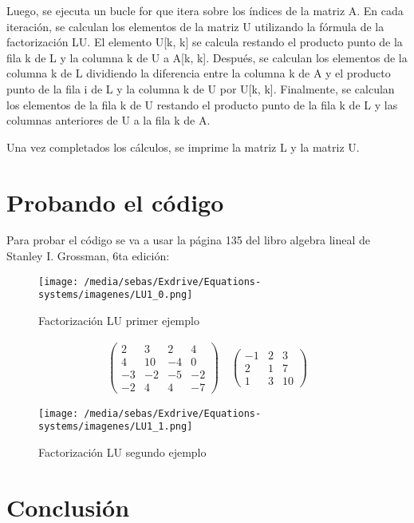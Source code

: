 \documentclass[letterpaper,12pt]{article}
\begin{document}
Luego, se ejecuta un bucle for que itera sobre los índices de la matriz A. En cada iteración, se calculan los elementos de la matriz U utilizando la fórmula de la factorización LU. El elemento U[k, k] se calcula restando el producto punto de la fila k de L y la columna k de U a A[k, k]. Después, se calculan los elementos de la columna k de L dividiendo la diferencia entre la columna k de A y el producto punto de la fila i de L y la columna k de U por U[k, k]. Finalmente, se calculan los elementos de la fila k de U restando el producto punto de la fila k de L y las columnas anteriores de U a la fila k de A.

Una vez completados los cálculos, se imprime la matriz L y la matriz U.

\section*{Probando el código}
Para probar el código se va a usar la página 135 del libro algebra lineal de Stanley I. Grossman, 6ta edición:
\begin{figure}[htbp]
    \centering
    \texttt{[image: /media/sebas/Exdrive/Equations-systems/imagenes/LU1\_0.png]}
    \caption{Factorización LU primer ejemplo}
    \label{fig: Factorización LU segundo ejemplo}
\end{figure}

\begin{align*}
    \begin{pmatrix}
        2 & 3 & 2 & 4 \\
        4 & 10 & -4 & 0 \\
        -3 & -2 & -5 & -2 \\
        -2 & 4 & 4 & -7
    \end{pmatrix}
    \quad
    \begin{pmatrix}
        -1 & 2 & 3 \\
        2 & 1 & 7 \\
        1 & 3 & 10
    \end{pmatrix}
    \end{align*}

\begin{figure}[htbp]
    \centering
    \texttt{[image: /media/sebas/Exdrive/Equations-systems/imagenes/LU1\_1.png]}
    \caption{Factorización LU segundo ejemplo}
    \label{fig: Factorización LU segundo ejemplo}
\end{figure}

\section{Conclusión}
\end{document}

